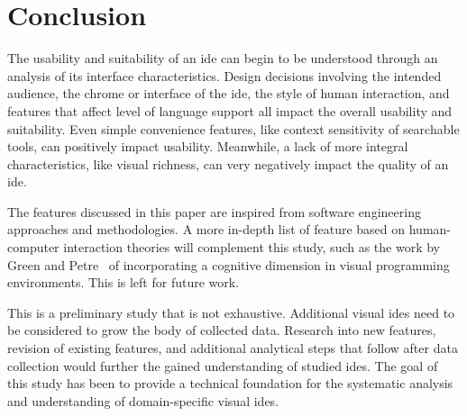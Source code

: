 \section{Conclusion}
\label{sec:conclusion}

The usability and suitability of an \ac{ide} can begin to be understood
through an analysis of its interface characteristics. Design decisions
involving the intended audience, the chrome or interface of the \ac{ide},
the style of human interaction, and features that affect level of language
support all impact the overall usability and suitability. Even simple
convenience features, like context sensitivity of searchable tools, can
positively impact usability. Meanwhile, a lack of more integral characteristics,
like visual richness, can very negatively impact the quality of an \ac{ide}.

The features discussed in this paper are inspired from software engineering approaches and methodologies.
A more in-depth list of feature based on human-computer interaction theories will complement this study,
such as the work by Green and Petre~\cite{Green1996} of incorporating a cognitive dimension in visual programming environments.
This is left for future work.

This is a preliminary study that is not exhaustive. Additional visual \acp{ide} need to be
considered to grow the body of collected data. Research into new features,
revision of existing features, and additional analytical steps that follow after data
collection would further the gained understanding of studied \acp{ide}.
The goal of this study has been to provide a technical foundation for the
systematic analysis and understanding of domain-specific visual \acp{ide}.
